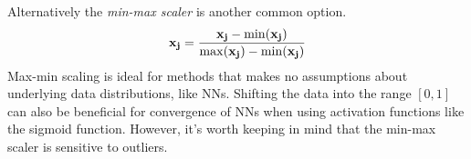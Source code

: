 Alternatively the \textit{min-max scaler} is another common option. 
\begin{equation}\label{min-max}
    \bold{x_j} = \frac{\bold{x_j}-\min(\bold{x_j})}{\max(\bold{x_j})-\min(\bold{x_j})}
\end{equation}
Max-min scaling is ideal for methods that makes no assumptions about underlying data distributions, like NNs. Shifting the data into the range $[0,1]$ can also be beneficial for convergence of NNs when using activation functions like the sigmoid function. However, it's worth keeping in mind that the min-max scaler is sensitive to outliers. 





